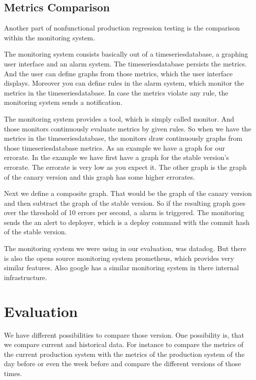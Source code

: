 \section{Metrics Comparison}

Another part of nonfunctional production regression testing is the comparison within the
monitoring system.

The monitoring system consists basically out of a timeseriesdatabase, a graphing user
interface and an alarm system. The timeseriesdatabase persists the metrics. And the user
can define graphs from those metrics, which the user interface displays. Moreover you can
define rules in the alarm system, which monitor the metrics in the timeseriesdatabase.
In case the metrics violate any rule, the monitoring system sends a notification.

The monitoring system provides a tool, which is simply called monitor. And those monitors
continuously evaluate metrics by given rules. So when we have the metrics in the
timeseriesdatabase, the monitors draw continuously graphs from those timeseriesdatabase
metrics. As an example we have a graph for our errorate. In the example we have first have
a graph for the stable version's errorate. The errorate is very low as you expect it. The
other graph is the graph of the canary version and this graph has some higher errorates.

Next we define a composite graph. That would be the graph of the canary version and then
subtract the graph of the stable version. So if the resulting graph goes over the
threshold of 10 errors per second, a alarm is triggered. The monitoring sends the an alert
to deployer, which is a deploy command with the commit hash of the stable version.

The monitoring system we were using in our evaluation, was datadog. But there is also the
opens source monitoring system prometheus, which provides very similar features. Also
google has a similar monitoring system in there internal infrastructure.

\chapter{Evaluation}

We have different possibilities to compare those version. One possibility is, that we
compare current and historical data. For instance to compare the metrics of the current
production system with the metrics of the production system of the day before or even the
week before and compare the different versions of those times.

